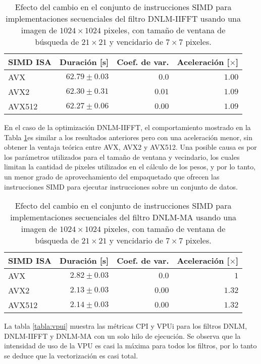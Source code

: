 \begin{table}
\protect\caption[Efecto de vectorización con instrucciones SIMD para el filtro DNLM-IIFFT]{Efecto del cambio en el conjunto de instrucciones SIMD para implementaciones secuenciales del filtro DNLM-IIFFT usando una imagen de  $1024 \times 1024$ pixeles, con tama\~no de ventana de búsqueda de $21 \times 21$ y vencidario de $7 \times 7$ pixeles. \label{tabla:vec_dnlm_iifft}}
\centering
\begin{tabular}{lrrr}
SIMD ISA & Duración [s]& Coef. de var. & Aceleración [$\times$] \tabularnewline
\hline
AVX & $62.79\pm0.03$ & $0.0$ & $1.00$\tabularnewline
AVX2 & $62.30\pm0.31$ & $0.01$ & $1.09$\tabularnewline
AVX512 & $62.27\pm 0.06$ & $0.00$ & $1.09$ \tabularnewline
\end{tabular}
\end{table}


En el caso de la optimización DNLM-IIFFT, el comportamiento mostrado en la Tabla \ref{tabla:vec_dnlm_iifft}es similar a los resultados anteriores pero con una aceleración menor, sin obtener la ventaja teórica entre AVX, AVX2 y AVX512. Una posible causa es por los parámetros utilizados para el tama\~no de ventana y vecindario, los cuales limitan la cantidad de pixeles utilizados en el cálculo de los pesos, y por lo tanto, un menor grado de aprovechamiento del empaquetado que ofrecen las instrucciones SIMD para ejecutar instrucciones sobre un conjunto de datos.

\begin{table}
\protect\caption[Efecto de vectorización con instrucciones SIMD para el filtro DNLM-MA]{Efecto del cambio en el conjunto de instrucciones SIMD para implementaciones secuenciales del filtro DNLM-MA usando una imagen de  $1024 \times 1024$ pixeles, con tama\~no de ventana de búsqueda de $21 \times 21$ y vencidario de $7 \times 7$ pixeles. \label{tabla:vec_dnlm_MA}}
\centering
\begin{tabular}{lrrr}
SIMD ISA & Duración [s]& Coef. de var. & Aceleración [$\times$] \tabularnewline
\hline
AVX & $2.82\pm0.03$ & $0.0$ & $1$\tabularnewline
AVX2 & $2.13\pm0.03$ & $0.00$ & $1.32$\tabularnewline
AVX512 & $2.14\pm 0.03$ & $0.00$ & $1.32$ \tabularnewline
\end{tabular}
\end{table}

La tabla \ref{tabla:vpui} muestra las métricas CPI y VPUi para los filtros DNLM, DNLM-IIFFT y DNLM-MA con un solo hilo de ejecución. Se observa que la intensidad de uso de la VPU es casi la máxima para todos los filtros, por lo tanto se deduce que la vectorización es casi total.

